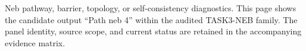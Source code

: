 Neb pathway, barrier, topology, or self-consistency diagnostics. This page shows the candidate output ``Path neb 4'' within the audited TASK3-NEB family. The panel identity, source scope, and current status are retained in the accompanying evidence matrix.
